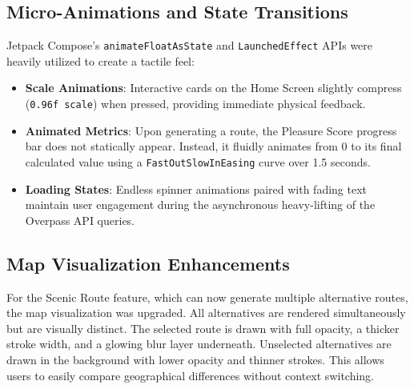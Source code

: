 \documentclass[12pt,a4paper,oneside]{report}
\begin{document}
\subsection{Micro-Animations and State Transitions}
Jetpack Compose's \texttt{animateFloatAsState} and \texttt{LaunchedEffect} APIs were heavily utilized to create a tactile feel:
\begin{itemize}
    \item \textbf{Scale Animations}: Interactive cards on the Home Screen slightly compress (\texttt{0.96f scale}) when pressed, providing immediate physical feedback.
    \item \textbf{Animated Metrics}: Upon generating a route, the Pleasure Score progress bar does not statically appear. Instead, it fluidly animates from 0 to its final calculated value using a \texttt{FastOutSlowInEasing} curve over 1.5 seconds.
    \item \textbf{Loading States}: Endless spinner animations paired with fading text maintain user engagement during the asynchronous heavy-lifting of the Overpass API queries.
\end{itemize}

\subsection{Map Visualization Enhancements}
For the Scenic Route feature, which can now generate multiple alternative routes, the map visualization was upgraded. All alternatives are rendered simultaneously but are visually distinct. The selected route is drawn with full opacity, a thicker stroke width, and a glowing blur layer underneath. Unselected alternatives are drawn in the background with lower opacity and thinner strokes. This allows users to easily compare geographical differences without context switching.
\end{document}
